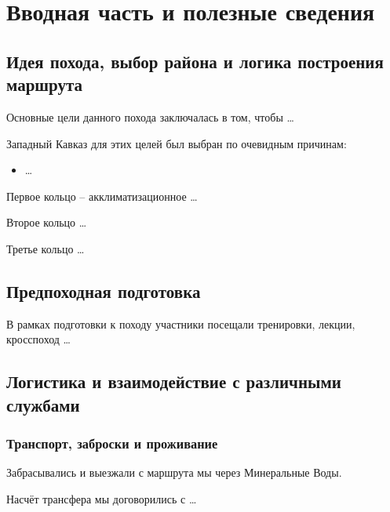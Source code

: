 \section{Вводная часть и полезные сведения}\label{sec:introduction}
	\subsection{Идея похода, выбор района и логика построения маршрута}
		Основные цели данного похода заключалась в том, чтобы \dots

		Западный Кавказ для этих целей был выбран по очевидным причинам:
		\begin{itemize}
			\item \dots
		\end{itemize}

		Первое кольцо -- акклиматизационное \dots

		Второе кольцо \dots

		Третье кольцо \dots
	
	
	\subsection{Предпоходная подготовка}
		В рамках подготовки к походу участники посещали тренировки, лекции, кросспоход	\dots 
	

	\subsection{Логистика и взаимодействие с различными службами}
		\subsubsection{Транспорт, заброски и проживание}

			Забрасывались и выезжали с маршрута мы через Минеральные Воды.
			
			Насчёт трансфера мы договорились с \dots

